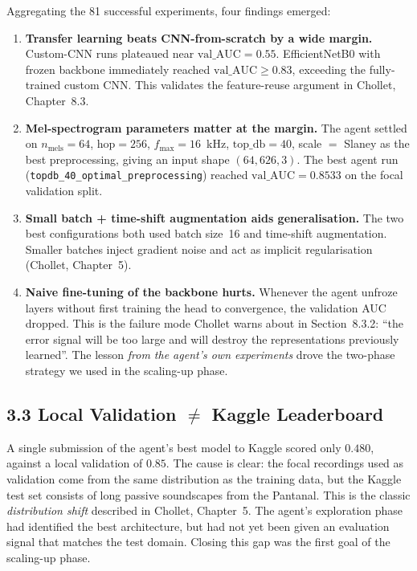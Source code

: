 \documentclass[11pt,a4paper]{article}
\begin{document}
Aggregating the 81 successful experiments, four findings emerged:
\begin{enumerate}
\item \textbf{Transfer learning beats CNN-from-scratch by a wide margin.} Custom-CNN runs plateaued near $\text{val\_AUC}=0.55$. EfficientNetB0 with frozen backbone immediately reached $\text{val\_AUC}\ge 0.83$, exceeding the fully-trained custom CNN. This validates the feature-reuse argument in Chollet, Chapter~8.3.
\item \textbf{Mel-spectrogram parameters matter at the margin.} The agent settled on $n_{\text{mels}}=64$, $\text{hop}=256$, $f_{\max}=16$~kHz, $\text{top\_db}=40$, scale $=$ Slaney as the best preprocessing, giving an input shape $(64, 626, 3)$. The best agent run (\texttt{topdb\_40\_optimal\_preprocessing}) reached $\text{val\_AUC}=0.8533$ on the focal validation split.
\item \textbf{Small batch + time-shift augmentation aids generalisation.} The two best configurations both used batch size~16 and time-shift augmentation. Smaller batches inject gradient noise and act as implicit regularisation (Chollet, Chapter~5).
\item \textbf{Naive fine-tuning of the backbone hurts.} Whenever the agent unfroze layers without first training the head to convergence, the validation AUC dropped. This is the failure mode Chollet warns about in Section~8.3.2: ``the error signal will be too large and will destroy the representations previously learned''. The lesson \emph{from the agent's own experiments} drove the two-phase strategy we used in the scaling-up phase.
\end{enumerate}

\subsection*{3.3 Local Validation $\neq$ Kaggle Leaderboard}

A single submission of the agent's best model to Kaggle scored only $0.480$, against a local validation of $0.85$. The cause is clear: the focal recordings used as validation come from the same distribution as the training data, but the Kaggle test set consists of long passive soundscapes from the Pantanal. This is the classic \emph{distribution shift} described in Chollet, Chapter~5. The agent's exploration phase had identified the best architecture, but had not yet been given an evaluation signal that matches the test domain. Closing this gap was the first goal of the scaling-up phase.
\end{document}
